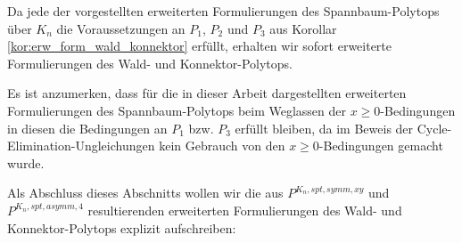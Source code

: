 \documentclass[10p,a4paper,BCOR = 12mm, DIV=15]{scrbook}
\begin{document}
Da jede der vorgestellten erweiterten Formulierungen des Spannbaum-Polytops über $K_n$ die Voraussetzungen an $P_1$, $P_2$ und $P_3$ aus Korollar \ref{kor:erw_form_wald_konnektor} erfüllt, erhalten wir sofort erweiterte Formulierungen des Wald- und Konnektor-Polytops.

Es ist anzumerken, dass für die in dieser Arbeit dargestellten erweiterten Formulierungen des Spannbaum-Polytops beim Weglassen der $x \geq 0$-Bedingungen in diesen die Bedingungen an $P_1$ bzw. $P_3$ erfüllt bleiben, da im Beweis der Cycle-Elimination-Ungleichungen kein Gebrauch von den $x \geq 0$-Bedingungen gemacht wurde.

Als Abschluss dieses Abschnitts wollen wir die aus $P^{K_n, spt, symm, xy}$ und $P^{K_n, spt, asymm, 4}$ resultierenden erweiterten Formulierungen des Wald- und Konnektor-Poly\-tops explizit aufschreiben:
\end{document}
